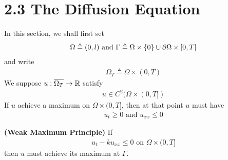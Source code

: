 \documentclass{report}
\begin{document}
\section{2.3 The Diffusion Equation}
\begin{mdframed}
In this section, we shall first set 
\begin{align*}
\Omega \triangleq (0,l)\text{ and }\Gamma \triangleq \Omega \times \{ 0 \}\cup  \partial \Omega \times [0,T]
\end{align*}
and write  
\begin{align*}
\Omega_T\triangleq \Omega \times (0,T)
\end{align*}
We suppose $u:\overline{\Omega_T}\rightarrow \mathbb{R}$ satisfy 
\begin{align*}
  u \in C^2(\Omega \times (0,T])
\end{align*}
If $u$ achieve a maximum on $\Omega \times (0,T]$, then at that point $u$ must have 
\begin{align*}
u_t\geq 0\text{ and }u_{xx}\leq 0
\end{align*}
\end{mdframed}
\begin{theorem}
\textbf{(Weak Maximum Principle)} If 
\begin{align}
\label{utk}
  u_t-ku_{xx}\leq  0\text{ on }\Omega \times (0,T]
\end{align}
then $u$ must achieve its maximum at  $\Gamma $.  
\end{theorem}
\end{document}
